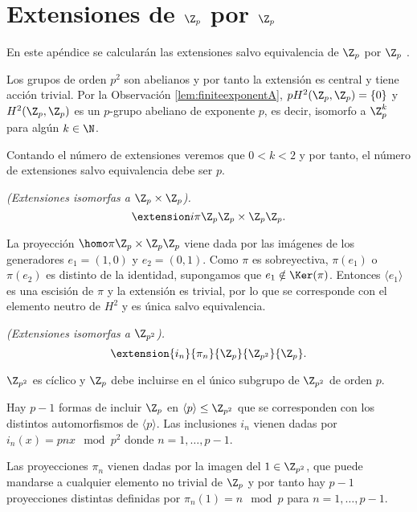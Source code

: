 \chapter{Extensiones de $\Z_p$ por $\Z_p$}\label{ZpxZp}


	En este apéndice se calcularán las extensiones salvo equivalencia de $\Z_p$ por $\Z_p$ . %
	
	Los grupos de orden $p^2$ son abelianos y por tanto la extensión es central y tiene acción trivial.
	Por la Observación \ref{lem:finiteexponentA}, $p H^2(\Z_p,\Z_p) = \{0\}$ y $H^2(\Z_p,\Z_p)$ es un $p$-grupo abeliano de exponente $p$, es decir, isomorfo a $\Z_p^k$ para algún $k\in \N$.
	
	Contando el número de extensiones veremos que $0<k<2$ y por tanto, el número de extensiones salvo equivalencia debe ser $p$.
	
	\textit{(Extensiones isomorfas a $\Z_p\times \Z_p$).}
	\begin{equation*}
		\extension i \pi {\Z_p} {\Z_p\times \Z_p} {\Z_p}.
	\end{equation*}
	
	La proyección $\homo \pi {\Z_p\times \Z_p} {\Z_p}$ viene dada por las imágenes de los generadores $e_1=(1,0)$ y $e_2=(0,1)$. Como $\pi$ es sobreyectiva, $\pi(e_1)$ o $\pi(e_2)$ es distinto de la identidad, supongamos que $e_1\notin \Ker(\pi)$. Entonces $\langle e_1 \rangle$ es una escisión de $\pi$ y la extensión es trivial, por lo que se corresponde con el elemento neutro de $H^2$ y es única salvo equivalencia.
	
	\textit{(Extensiones isomorfas a $\Z_{p^2}$).}
	\begin{equation*}
		\extension {i_n} {\pi_n} {\Z_p} {\Z_{p^2}} {\Z_p}.
	\end{equation*}
	
	$\Z_{p^2}$ es cíclico y $\Z_p$ debe incluirse en el único subgrupo de $\Z_{p^2}$ de orden $p$. 
	
	Hay $p-1$ formas de incluir $\Z_p$ en $\langle p \rangle \leq \Z_{p^2}$ que se corresponden con los distintos automorfismos de $\langle p \rangle$. Las inclusiones $i_n$ vienen dadas por $i_n(x) = pnx \mod p^2$ donde $n=1,\ldots,p-1$.
	
	Las proyecciones $\pi_n$ vienen dadas por la imagen del $1\in \Z_{p^2}$, que puede mandarse a cualquier elemento no trivial de $\Z_p$ y por tanto hay $p-1$ proyecciones distintas definidas por $\pi_n(1) = n \mod p$ para $n=1,\ldots, p-1$.
	
